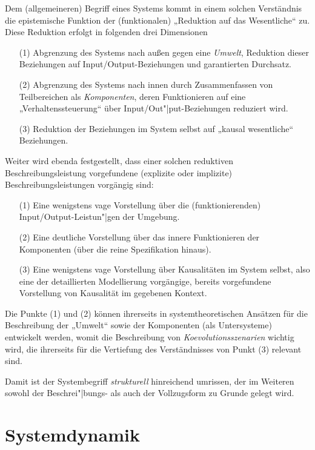\documentclass[12pt,a4paper]{article}
\begin{document}
Dem (allgemeineren) Begriff eines Systems kommt in einem solchen Verständnis
die epistemische Funktion der (funktionalen) „Reduktion auf das Wesentliche“
zu. Diese Reduktion erfolgt in folgenden drei Dimensionen
\cite[S. 18]{Graebe2020a}
\begin{itemize}
\item [(1)] Abgrenzung des Systems nach außen gegen eine \emph{Umwelt},
  Reduktion dieser Beziehungen auf Input/Output-Beziehungen und garantierten
  Durchsatz.
\item [(2)] Abgrenzung des Systems nach innen durch Zusammenfassen von
  Teilbereichen als \emph{Komponenten}, deren Funktionieren auf eine
  „Verhaltenssteuerung“ über Input/Out"|put-Beziehungen reduziert wird.
\item [(3)] Reduktion der Beziehungen im System selbst auf „kausal
  wesentliche“ Beziehungen.
\end{itemize}
Weiter wird ebenda festgestellt, dass einer solchen reduktiven
Beschreibungsleistung vorgefundene (explizite oder implizite)
Beschreibungsleistungen vorgängig sind:
\begin{enumerate}
\item[(1)] Eine wenigstens vage Vorstellung über die (funktionierenden)
  Input/Output-Leistun"|gen der Umgebung.
\item[(2)] Eine deutliche Vorstellung über das innere Funktionieren der
  Komponenten (über die reine Spezifikation hinaus).
\item[(3)] Eine wenigstens vage Vorstellung über Kausalitäten im System
  selbst, also eine der detaillierten Modellierung vorgängige, bereits
  vorgefundene Vorstellung von Kausalität im gegebenen Kontext.
\end{enumerate}
Die Punkte (1) und (2) können ihrerseits in systemtheoretischen Ansätzen für
die Beschreibung der „Umwelt“ sowie der Komponenten (als Untersysteme)
entwickelt werden, womit die Beschreibung von \emph{Koevolutionsszenarien}
wichtig wird, die ihrerseits für die Vertiefung des Verständnisses von Punkt
(3) relevant sind.

Damit ist der Systembegriff \emph{strukturell} hinreichend umrissen, der im
Weiteren sowohl der Beschrei"|bungs- als auch der Vollzugsform zu Grunde
gelegt wird.

\section{Systemdynamik}
\end{document}
